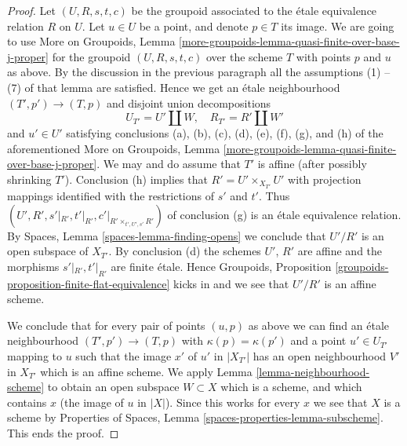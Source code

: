 \documentclass[10pt,a4paper]{amsart}
\theoremstyle{plain}
\theoremstyle{definition}
\theoremstyle{remark}
\numberwithin{equation}{subsection}
\begin{document}
\begin{proof}
\medskip\noindent
Let $(U, R, s, t, c)$ be the groupoid associated to the \'etale
equivalence relation $R$ on $U$. Let $u \in U$ be a point, and
denote $p \in T$ its image. We are going to use
More on Groupoids,
Lemma \ref{more-groupoids-lemma-quasi-finite-over-base-j-proper}
for the groupoid $(U, R, s, t, c)$ over the scheme $T$ with
points $p$ and $u$ as above.
By the discussion in the previous paragraph all the
assumptions (1) -- (7) of that lemma are satisfied.
Hence we get an \'etale neighbourhood
$(T', p') \to (T, p)$ and disjoint union decompositions
$$
U_{T'} = U' \amalg W, \quad
R_{T'} = R' \amalg W'
$$
and $u' \in U'$ satisfying conclusions
(a), (b), (c), (d), (e), (f), (g), and (h) of the aforementioned
More on Groupoids,
Lemma \ref{more-groupoids-lemma-quasi-finite-over-base-j-proper}.
We may and do assume that $T'$ is affine (after possibly shrinking $T'$).
Conclusion (h) implies that $R' = U' \times_{X_{T'}} U'$ with projection
mappings identified with the restrictions of $s'$ and $t'$.
Thus $(U', R', s'|_{R'}, t'|_{R'}, c'|_{R' \times_{t', U', s'} R'})$ of
conclusion (g) is an \'etale equivalence relation. By
Spaces, Lemma \ref{spaces-lemma-finding-opens}
we conclude that $U'/R'$ is an open subspace of $X_{T'}$. By conclusion (d)
the schemes $U'$, $R'$ are affine and the morphisms
$s'|_{R'}, t'|_{R'}$ are finite \'etale. Hence
Groupoids, Proposition \ref{groupoids-proposition-finite-flat-equivalence}
kicks in and we see that $U'/R'$ is an affine scheme.

\medskip\noindent
We conclude that for every pair of points $(u, p)$ as above we can
find an \'etale neighbourhood $(T', p') \to (T, p)$ with
$\kappa(p) = \kappa(p')$ and a point $u' \in U_{T'}$ mapping to $u$
such that the image $x'$ of $u'$ in $|X_{T'}|$ has an open neighbourhood
$V'$ in $X_{T'}$ which is an affine scheme. We apply
Lemma \ref{lemma-neighbourhood-scheme}
to obtain an open subspace $W \subset X$ which is a scheme, and
which contains $x$ (the image of $u$ in $|X|$).
Since this works for every $x$ we see that $X$
is a scheme by
Properties of Spaces, Lemma \ref{spaces-properties-lemma-subscheme}.
This ends the proof.
\end{proof}
\end{document}
